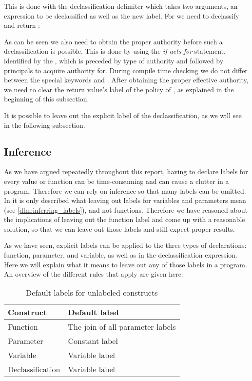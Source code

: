 This is done with the declassification delimiter \dlmc{<| |>} which takes two arguments, an expression to be declassified as well as the new label.
For  we need to declassify and return :\\
\begin{minipage}{\linewidth}

\end{minipage}

As can be seen we also need to obtain the proper authority before such a declassification is possible.
This is done by using the \emph{if-acts-for} statement, identified by the , which is preceded by type of authority and followed by principals to acquire authority for.
During compile time checking we do not differ between the special keywords  and .
After obtaining the proper effective authority, we need to clear the return value's label of the policy of , as explained in the beginning of this subsection.

It is possible to leave out the explicit label of the declassification, as we will see in the following subsection.

\subsection{Inference}
As we have argued repeatedly throughout this report, having to declare labels for every value or function can be time-consuming and can cause a clutter in a program.
Therefore we can rely on inference so that many labels can be omitted.
In \cite{myers1997} it is only described what leaving out labels for variables and parameters mean (see \cref{dlm:inferring_labels}), and not functions.
Therefore we have reasoned about the implications of leaving out the function label and come up with a reasonable solution, so that we can leave out those labels and still expect proper results.

As we have seen, explicit labels can be applied to the three types of declarations: function, parameter, and variable, as well as in the declassification expression.
Here we will explain what it means to leave out any of those labels in a program.
An overview of the different rules that apply are given here:
\begin{table}[H]
  \begin{tabularx}{\textwidth}{|l|X|}
    \hline
    \textbf{Construct} & \textbf{Default label} \\ \hline \hline
    Function & The join of all parameter labels \\ \hline
    Parameter & Constant label \\ \hline
    Variable & Variable label \\ \hline
    Declassification & Variable label \\ \hline
  \end{tabularx}
  \caption{Default labels for unlabeled constructs}
  \label{informal:table:default_labels}
\end{table}

